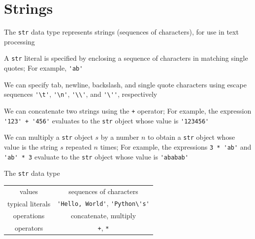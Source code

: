 \documentclass[8pt,a4paper,compress]{beamer}
\begin{document}
\section{Strings}
\begin{frame}[fragile]
\pause

The \lstinline{str} data type represents strings (sequences of characters), for use in text processing

\pause
\bigskip

A \lstinline{str} literal is specified by enclosing a sequence of characters in matching single quotes; For example, \lstinline{'ab'}

\pause
\bigskip

We can specify tab, newline, backslash, and single quote characters using escape sequences \lstinline{'\t'}, \lstinline{'\n'}, \lstinline{'\\'}, and \lstinline{'\''}, respectively

\pause
\bigskip

We can concatenate two strings using the \lstinline{+} operator; For example, the expression \lstinline{'123' + '456'} evaluates to the \lstinline{str} object whose value is \lstinline{'123456'}

\pause
\bigskip

We can multiply a \lstinline{str} object $s$ by a number $n$ to obtain a \lstinline{str} object whose value is the string $s$ repeated $n$ times; For example, the expressions \lstinline{3 * 'ab'} and \lstinline{'ab' * 3} evaluate to the \lstinline{str} object whose value is \lstinline{'ababab'}

\pause
\bigskip

The \lstinline{str} data type

\begin{center}
\begin{tabular}{c|c}
values & sequences of characters \\ 
typical literals & \lstinline$'Hello, World'$, \lstinline$'Python\'s'$ \\ 
operations & concatenate, multiply \\
operators & \lstinline$+$, \lstinline$*$
\end{tabular} 
\end{center}
\end{frame}
\end{document}
